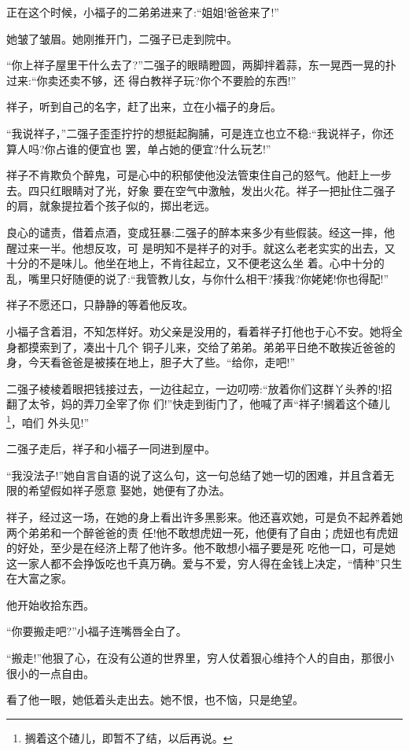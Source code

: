 \documentclass[11pt,a4paper,onecolumn]{article}
\begin{document}
正在这个时候，小福子的二弟弟进来了:``姐姐!爸爸来了!''

她皱了皱眉。她刚推开门，二强子已走到院中。

``你上祥子屋里干什么去了?''二强子的眼睛瞪圆，两脚拌着蒜，东一晃西一晃的扑过来:``你卖还卖不够，还
得白教祥子玩?你个不要脸的东西!''

祥子，听到自己的名字，赶了出来，立在小福子的身后。

``我说祥子，''二强子歪歪拧拧的想挺起胸脯，可是连立也立不稳:``我说祥子，你还算人吗?你占谁的便宜也
罢，单占她的便宜?什么玩艺!''

祥子不肯欺负个醉鬼，可是心中的积郁使他没法管束住自己的怒气。他赶上一步去。四只红眼睛对了光，好象
要在空气中激触，发出火花。祥子一把扯住二强子的肩，就象提拉着个孩子似的，掷出老远。

良心的谴责，借着点酒，变成狂暴:二强子的醉本来多少有些假装。经这一摔，他醒过来一半。他想反攻，可
是明知不是祥子的对手。就这么老老实实的出去，又十分的不是味儿。他坐在地上，不肯往起立，又不便老这么坐
着。心中十分的乱，嘴里只好随便的说了:``我管教儿女，与你什么相干?揍我?你姥姥!你也得配!''

祥子不愿还口，只静静的等着他反攻。

小福子含着泪，不知怎样好。劝父亲是没用的，看着祥子打他也于心不安。她将全身都摸索到了，凑出十几个
铜子儿来，交给了弟弟。弟弟平日绝不敢挨近爸爸的身，今天看爸爸是被揍在地上，胆子大了些。``给你，走吧!''

二强子棱棱着眼把钱接过去，一边往起立，一边叨唠:``放着你们这群丫头养的!招翻了太爷，妈的弄刀全宰了你
们!''快走到街门了，他喊了声``祥子!搁着这个碴儿\footnote{搁着这个碴儿，即暂不了结，以后再说。}，咱们
外头见!''

二强子走后，祥子和小福子一同进到屋中。

``我没法子!''她自言自语的说了这么句，这一句总结了她一切的困难，并且含着无限的希望\myrule 假如祥子愿意
娶她，她便有了办法。

祥子，经过这一场，在她的身上看出许多黑影来。他还喜欢她，可是负不起养着她两个弟弟和一个醉爸爸的责
任!他不敢想虎妞一死，他便有了自由；虎妞也有虎妞的好处，至少是在经济上帮了他许多。他不敢想小福子要是死
吃他一口，可是她这一家人都不会挣饭吃也千真万确。爱与不爱，穷人得在金钱上决定，``情种''只生在大富之家。

他开始收拾东西。

``你要搬走吧?''小福子连嘴唇全白了。

``搬走!''他狠了心，在没有公道的世界里，穷人仗着狠心维持个人的自由，那很小很小的一点自由。

看了他一眼，她低着头走出去。她不恨，也不恼，只是绝望。
\end{document}
